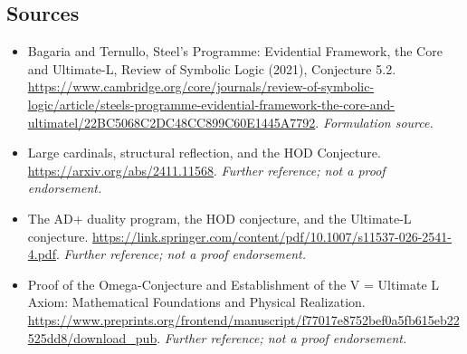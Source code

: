 \documentclass[11pt]{article}
\begin{document}
\subsection{Sources}
\begin{itemize}
\item[S1]Bagaria and Ternullo, Steel's Programme: Evidential Framework, the Core and Ultimate-L, Review of Symbolic Logic (2021), Conjecture 5.2.
\url{https://www.cambridge.org/core/journals/review-of-symbolic-logic/article/steels-programme-evidential-framework-the-core-and-ultimatel/22BC5068C2DC48CC899C60E1445A7792}.
\textit{Formulation source.}
\item[S2]Large cardinals, structural reflection, and the HOD Conjecture.
\url{https://arxiv.org/abs/2411.11568}.
\textit{Further reference; not a proof endorsement.}
\item[S3]The AD+ duality program, the HOD conjecture, and the Ultimate-L conjecture.
\url{https://link.springer.com/content/pdf/10.1007/s11537-026-2541-4.pdf}.
\textit{Further reference; not a proof endorsement.}
\item[S4]Proof of the Omega-Conjecture and Establishment of the V = Ultimate L Axiom: Mathematical Foundations and Physical Realization.
\url{https://www.preprints.org/frontend/manuscript/f77017e8752bef0a5fb615eb22525dd8/download_pub}.
\textit{Further reference; not a proof endorsement.}
\end{itemize}
\end{document}
